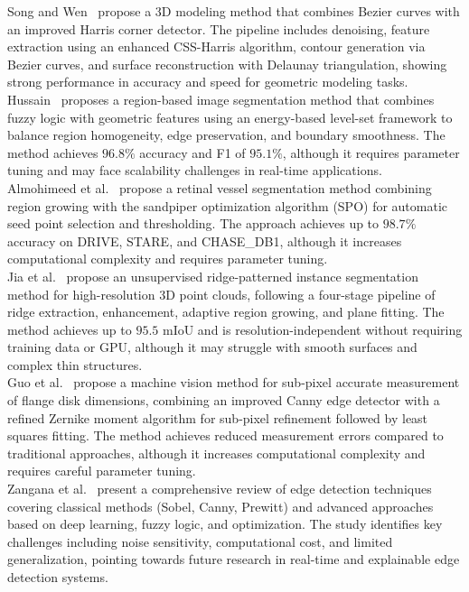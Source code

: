 \documentclass[11pt]{article}
\begin{document}
Song and Wen~\cite{Song2025BezierHarris} propose a 3D modeling method that
combines Bezier curves with an improved Harris corner detector. The pipeline
includes denoising, feature extraction using an enhanced CSS-Harris algorithm,
contour generation via Bezier curves, and surface reconstruction with Delaunay
triangulation, showing strong performance in accuracy and speed for geometric
modeling tasks.\\

Hussain~\cite{Hussain2025FuzzySegmentation} proposes a region-based image
segmentation method that combines fuzzy logic with geometric features using an
energy-based level-set framework to balance region homogeneity, edge preservation,
and boundary smoothness. The method achieves $96.8\%$ accuracy and F1 of $95.1\%$,
although it requires parameter tuning and may face scalability challenges in
real-time applications.\\

Almohimeed et al.~\cite{Almohimeed2024SPORGRBVS} propose a retinal vessel
segmentation method combining region growing with the sandpiper optimization
algorithm (SPO) for automatic seed point selection and thresholding. The approach
achieves up to $98.7\%$ accuracy on DRIVE, STARE, and CHASE\_DB1, although it
increases computational complexity and requires parameter tuning.\\

Jia et al.~\cite{Jia2025RidgeSegmentation} propose an unsupervised
ridge-patterned instance segmentation method for high-resolution 3D point clouds,
following a four-stage pipeline of ridge extraction, enhancement, adaptive region
growing, and plane fitting. The method achieves up to $95.5$ mIoU and is
resolution-independent without requiring training data or GPU, although it may
struggle with smooth surfaces and complex thin structures.\\

Guo et al.~\cite{Guo2024SubpixelFlange} propose a machine vision method for
sub-pixel accurate measurement of flange disk dimensions, combining an improved
Canny edge detector with a refined Zernike moment algorithm for sub-pixel
refinement followed by least squares fitting. The method achieves reduced
measurement errors compared to traditional approaches, although it increases
computational complexity and requires careful parameter tuning.\\

Zangana et al.~\cite{Zangana2024EdgeReview} present a comprehensive review of
edge detection techniques covering classical methods (Sobel, Canny, Prewitt) and
advanced approaches based on deep learning, fuzzy logic, and optimization. The
study identifies key challenges including noise sensitivity, computational cost,
and limited generalization, pointing towards future research in real-time and
explainable edge detection systems.\\
\end{document}
